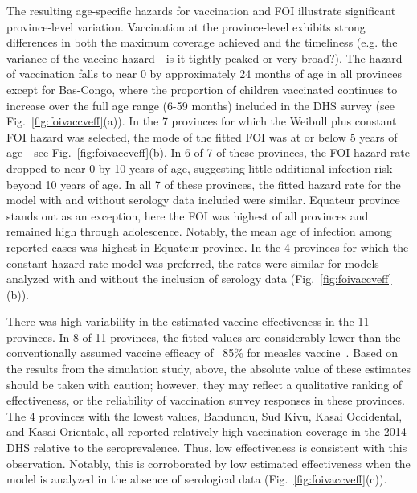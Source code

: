 \documentclass[nofootinbib,aps,pre,twocolumn,superscriptaddress,showkeys,showpacs]{revtex4-1}
\begin{document}
The resulting age-specific hazards for vaccination and FOI illustrate significant province-level variation.  Vaccination at the province-level exhibits strong differences in both the maximum coverage achieved and the timeliness (e.g. the variance of the vaccine hazard - is it tightly peaked or very broad?).  The hazard of vaccination falls to near 0 by approximately 24 months of age in all provinces except for Bas-Congo, where the proportion of children vaccinated continues to increase over the full age range (6-59 months) included in the DHS survey (see Fig.~\ref{fig:foivaccveff}(a)). In the 7 provinces for which the Weibull plus constant FOI hazard was selected, the mode of the fitted FOI was at or below 5 years of age - see Fig.~\ref{fig:foivaccveff}(b).  In 6 of 7 of these provinces, the FOI hazard rate dropped to near 0 by 10 years of age, suggesting little additional infection risk beyond 10 years of age.  In all 7 of these provinces, the fitted hazard rate for the model with and without serology data included were similar.  Equateur province stands out as an exception, here the FOI was highest of all provinces and remained high through adolescence. Notably, the mean age of infection among reported cases was highest in Equateur province. In the 4 provinces for which the constant hazard rate model was preferred, the rates were similar for models analyzed with and without the inclusion of serology data (Fig.~\ref{fig:foivaccveff}(b)).

There was high variability in the estimated vaccine effectiveness in the 11 provinces.  In 8 of 11 provinces, the fitted values are considerably lower than the conventionally assumed vaccine efficacy of ~85\% for measles vaccine~\cite{Uzicanin2011}. Based on the results from the simulation study, above, the absolute value of these estimates should be taken with caution; however, they may reflect a qualitative ranking of effectiveness, or the reliability of vaccination survey responses in these provinces.  The 4 provinces with the lowest values, Bandundu, Sud Kivu, Kasai Occidental, and Kasai Orientale, all reported relatively high vaccination coverage in the 2014 DHS relative to the seroprevalence.  Thus, low effectiveness is consistent with this observation.  Notably, this is corroborated by low estimated effectiveness when the model is analyzed in the absence of serological data  (Fig.~\ref{fig:foivaccveff}(c)).
\end{document}
